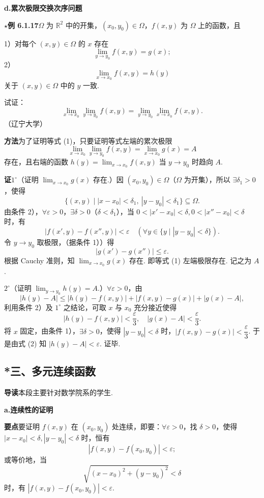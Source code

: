 \documentclass[UTF8,12pt,a4paper,fontset=fandol]{ctexart}
\begin{document}
\noindent\textbf{d.\quad 累次极限交换次序问题}

\noindent\textbf{$\star$例 6.1.17}\quad $\Omega$ 为 $\mathbb{R}^2$ 中的开集，$(x_0,y_0)\in\Omega$，$f(x,y)$ 为 $\Omega$ 上的函数，且

1）对每个 $(x,y)\in\Omega$ 的 $x$ 存在
\[
  \lim_{y\to y_0}f(x,y)=g(x);
\]
2）
\[
  \lim_{x\to x_0}f(x,y)=h(y)
\]
关于 $(x,y)\in\Omega$ 中的 $y$ 一致.

试证：
\[
  \lim_{x\to x_0}\lim_{y\to y_0}f(x,y)
  =\lim_{y\to y_0}\lim_{x\to x_0}f(x,y).
\tag{1}
\]
（辽宁大学）

\noindent\textbf{方法}\quad 为了证明等式 (1)，只要证明等式左端的累次极限
\[
  \lim_{x\to x_0}\lim_{y\to y_0}f(x,y)=\lim_{x\to x_0}g(x)=A
\]
存在，且右端的函数 $h(y)=\displaystyle\lim_{x\to x_0}f(x,y)$ 当 $y\to y_0$ 时趋向 $A$.

\noindent\textbf{证}\quad $1^\circ$（证明 $\displaystyle\lim_{x\to x_0}g(x)$ 存在.）因 $(x_0,y_0)\in\Omega$（$\Omega$ 为开集），所以 $\exists\delta_1>0$，使得
\[
  \{(x,y)\mid |x-x_0|<\delta_1,\ |y-y_0|<\delta_1\}\subseteq\Omega.
\]
由条件 2），$\forall\varepsilon>0$，$\exists\delta>0$（$\delta<\delta_1$），当 $0<|x'-x_0|<\delta,0<|x''-x_0|<\delta$ 时，有
\[
  |f(x',y)-f(x'',y)|<\varepsilon
  \quad(\forall y\in\{y\mid |y-y_0|<\delta\}).
\]
令 $y\to y_0$ 取极限，（据条件 1））得
\[
  |g(x')-g(x'')|\le\varepsilon.
\]
根据 Cauchy 准则，知 $\displaystyle\lim_{x\to x_0}g(x)$ 存在. 即等式 (1) 左端极限存在. 记之为 $A$.

$2^\circ$（证明 $\displaystyle\lim_{y\to y_0}h(y)=A$.）$\forall\varepsilon>0$，由
\[
  |h(y)-A|\le |h(y)-f(x,y)|+|f(x,y)-g(x)|+|g(x)-A|, \tag{2}
\]
利用条件 2）及 $1^\circ$ 之结论，可取 $x$ 与 $x_0$ 充分接近使得
\[
  |h(y)-f(x,y)|<\frac{\varepsilon}{3},\quad
  |g(x)-A|<\frac{\varepsilon}{3}.
\]
将 $x$ 固定，由条件 1），$\exists\delta>0$，使得 $|y-y_0|<\delta$ 时，$|f(x,y)-g(x)|<\dfrac{\varepsilon}{3}$. 于是由式 (2) 知 $|h(y)-A|<\varepsilon$. 证毕.

\subsection*{*三、多元连续函数}

\noindent\textbf{导读}\quad 本段主要针对数学院系的学生.

\noindent\textbf{a.\quad 连续性的证明}

\noindent\textbf{要点}\quad 要证明 $f(x,y)$ 在 $(x_0,y_0)$ 处连续，即要：$\forall\varepsilon>0$，找 $\delta>0$，使得 $|x-x_0|<\delta,|y-y_0|<\delta$ 时，恒有
\[
  |f(x,y)-f(x_0,y_0)|<\varepsilon;
\]
或等价地，当
\[
  \sqrt{(x-x_0)^2+(y-y_0)^2}<\delta
\]
时，有 $|f(x,y)-f(x_0,y_0)|<\varepsilon$.
\end{document}
